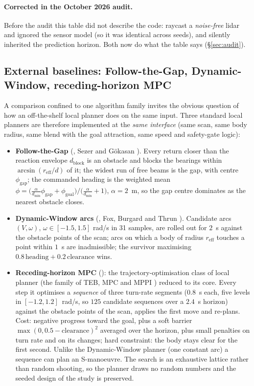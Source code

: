 \paragraph{Corrected in the October 2026 audit.} Before the audit this table
did not describe the code:  raycast a \emph{noise-free} lidar
and ignored the sensor model (so it was identical across seeds), and
 silently inherited the prediction horizon. Both now do what the
table says (\S\ref{sec:audit}).

\subsection{External baselines: Follow-the-Gap, Dynamic-Window, receding-horizon MPC}
\label{sec:baselines}

A comparison confined to one algorithm family invites the obvious question
of how an off-the-shelf local planner does on the same input. Three standard
local planners are therefore implemented at the \emph{same interface}
(same scan, same body radius, same blend with the goal attraction, same
speed and safety-gate logic):

\begin{itemize}[leftmargin=1.6em]
\item \textbf{Follow-the-Gap} (, Sezer and G\"okasan
\cite{sezer2012}). Every return closer than the reaction envelope
$d_{\mathrm{block}}$ is an obstacle and blocks the bearings within
$\arcsin(r_{\mathrm{eff}}/d)$ of it; the widest run of free beams is the
gap, with centre $\phi_{\mathrm{gap}}$; the commanded heading is the
weighted mean
$\phi = \bigl(\tfrac{\alpha}{d_{\min}}\phi_{\mathrm{gap}} +
\phi_{\mathrm{goal}}\bigr)/\bigl(\tfrac{\alpha}{d_{\min}} + 1\bigr)$,
$\alpha = 2$~m, so the gap centre dominates as the nearest obstacle closes.
\item \textbf{Dynamic-Window arcs} (, Fox, Burgard and Thrun
\cite{fox1997}). Candidate arcs $(V, \omega)$, $\omega \in [-1.5, 1.5]$
rad/s in 31 samples, are rolled out for $2$~s against the obstacle points
of the scan; arcs on which a body of radius $r_{\mathrm{eff}}$ touches a
point within $1$~s are inadmissible; the survivor maximising
$0.8\,\mathrm{heading} + 0.2\,\mathrm{clearance}$ wins.
\item \textbf{Receding-horizon MPC} (): the
trajectory-optimisation class of local planner (the family of TEB, MPC and
MPPI \cite{rosmann2017,williams2017}) reduced to its core. Every step it
optimises a \emph{sequence} of three turn-rate segments ($0.8$~s each,
five levels in $[-1.2, 1.2]$~rad/s, so $125$ candidate sequences over a
$2.4$~s horizon) against the obstacle points of the scan, applies the first
move and re-plans. Cost: negative progress toward the goal, plus a soft
barrier $\max(0, 0.5 - \mathrm{clearance})^2$ averaged over the horizon,
plus small penalties on turn rate and on its changes; hard constraint: the
body stays clear for the first second. Unlike the Dynamic-Window planner
(one constant arc) a sequence can plan an S-manoeuvre. The search is an
exhaustive lattice rather than random shooting, so the planner draws no
random numbers and the seeded design of the study is preserved.
\end{itemize}

